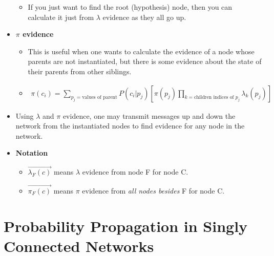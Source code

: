 \documentclass[12pt,twoside]{article}
\begin{document}
\begin{itemize}
\begin{itemize}
            \item If you just want to find the root (hypothesis) node, then you can calculate it just from \(\lambda\) evidence as they all go up.
    \end{itemize}
    \item \textbf{\(\pi\) evidence}
        \begin{itemize}
            \item This is useful when one wants to calculate the evidence of a node whose parents are not instantiated, but there is some evidence about the state of their parents from other siblings.
            \item \begin{align}
                    \pi(c_i) = \sum_{p_j=\text{values of parent}}P(c_i|p_j)[\pi (p_j) \prod_{k=\text{children indices of }p_j}\lambda_k(p_j)]
                \end{align}
        \end{itemize}
    \item Using \(\lambda\) and \(\pi\) evidence, one may transmit messages up and down the network from the instantiated nodes to find evidence for any node in the network.
    \item \textbf{Notation}
        \begin{itemize}
            \item  \(\vec{\lambda_F(c)} \) means \(\lambda\) evidence from node F for node C.
            \item  \(\vec{\pi_F(c)}\) means \(\pi\) evidence from \textit{all nodes besides} F for node C.
        \end{itemize}
\end{itemize}

\section{Probability Propagation in Singly Connected Networks}
\end{document}
